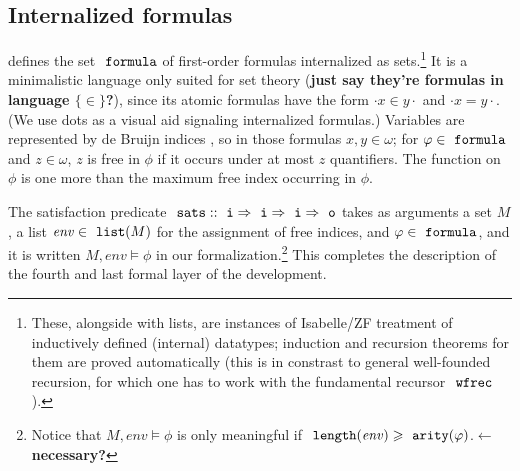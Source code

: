 \subsection{Internalized formulas}
\label{sec:internalized-formulas}

 defines the set $\formula$ of first-order
formulas internalized as sets.\footnote{These, alongside with lists, are instances of
  Isabelle/ZF treatment of inductively defined (internal) datatypes;
  induction and recursion theorems for them are proved automatically
  (this is in constrast to general well-founded recursion, for which
  one has to work with the fundamental recursor $\isatt{wfrec}$).}  It
is a minimalistic language only suited for set theory
(\textbf{just say they're formulas in language $\{\in\}$?}), since its
atomic formulas have the form $\cdot x \in y\cdot$ and $\cdot x =
y\cdot$. (We use dots as a visual aid signaling internalized formulas.)
Variables are represented by de Bruijn indices \cite{MR0321704}, so in
those formulas $x,y \in \omega$; for $\phi\in\formula$ and
$z\in\omega$, $z$ is free in $\phi$ if it occurs under at most $z$
quantifiers. The  function on $\phi$ is one more than the
maximum free index occurring in $\phi$.

The satisfaction predicate
$\isatt{sats}::\tyi\fun\tyi\fun\tyi\fun\tyo$ takes as arguments a set
$M$, a list $\mathit{env}\in\isatt{list}(M)$ for the assignment of
free indices, and $\phi\in\formula$, and it is written
$M,\mathit{env}\models\phi$ in our formalization.\footnote{Notice that
  $M,\mathit{env}\models\phi$ is only meaningful if
  $\isatt{length}(\mathit{env}) \geqslant
\isatt{arity}(\phi)$.\textbf{$\leftarrow$ necessary?}} This completes the
description of the fourth and last formal layer of the development.

